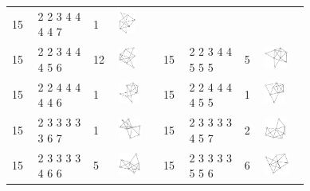 \begin{footnotesize}
\begin{longtable}{
        m{0.05\linewidth} m{0.15\linewidth} m{0.05\linewidth} m{0.12\linewidth} |
        m{0.05\linewidth} m{0.15\linewidth} m{0.05\linewidth} m{0.12\linewidth}
    }
15 & 2 2 3 4 4 4 4 7 & 1 & \includegraphics[height=0.7151cm]{15-universal-graphs/img/degree-sequences-example-graphs/graph-4-8-115}\\
15 & 2 2 3 4 4 4 5 6 & 12 & \includegraphics[height=0.7151cm]{15-universal-graphs/img/degree-sequences-example-graphs/graph-4-8-116} &
15 & 2 2 3 4 4 5 5 5 & 5 & \includegraphics[height=0.7151cm]{15-universal-graphs/img/degree-sequences-example-graphs/graph-4-8-117}\\
15 & 2 2 4 4 4 4 4 6 & 1 & \includegraphics[height=0.7151cm]{15-universal-graphs/img/degree-sequences-example-graphs/graph-4-8-118} &
15 & 2 2 4 4 4 4 5 5 & 1 & \includegraphics[height=0.7151cm]{15-universal-graphs/img/degree-sequences-example-graphs/graph-4-8-119}\\
15 & 2 3 3 3 3 3 6 7 & 1 & \includegraphics[height=0.7151cm]{15-universal-graphs/img/degree-sequences-example-graphs/graph-4-8-120} &
15 & 2 3 3 3 3 4 5 7 & 2 & \includegraphics[height=0.7151cm]{15-universal-graphs/img/degree-sequences-example-graphs/graph-4-8-121}\\
15 & 2 3 3 3 3 4 6 6 & 5 & \includegraphics[height=0.7151cm]{15-universal-graphs/img/degree-sequences-example-graphs/graph-4-8-122} &
15 & 2 3 3 3 3 5 5 6 & 6 & \includegraphics[height=0.7151cm]{15-universal-graphs/img/degree-sequences-example-graphs/graph-4-8-123}\\

\end{longtable}
\end{footnotesize}
